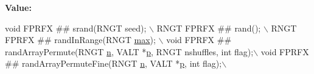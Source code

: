 {\bfseries Value\+:}
\begin{DoxyCode}
\textcolor{keywordtype}{void} FPRFX ## srand(RNGT seed); \(\backslash\)
  RNGT FPRFX ## rand(); \(\backslash\)
  RNGT FPRFX ## randInRange(RNGT \hyperlink{a00593_affe776513b24d84b39af8ab0930fef7f}{max}); \(\backslash\)
  void FPRFX ## randArrayPermute(RNGT \hyperlink{a00563_a4c2d80ab32fc3a598413ae25e9f2bdce}{n}, VALT *\hyperlink{a00611_ac483f6ce851c9ecd9fb835ff7551737c}{p}, RNGT nshuffles, \textcolor{keywordtype}{int} flag);\(\backslash\)
  void FPRFX ## randArrayPermuteFine(RNGT \hyperlink{a00563_a4c2d80ab32fc3a598413ae25e9f2bdce}{n}, VALT *\hyperlink{a00611_ac483f6ce851c9ecd9fb835ff7551737c}{p}, \textcolor{keywordtype}{int} flag);\(\backslash\)
\end{DoxyCode}
